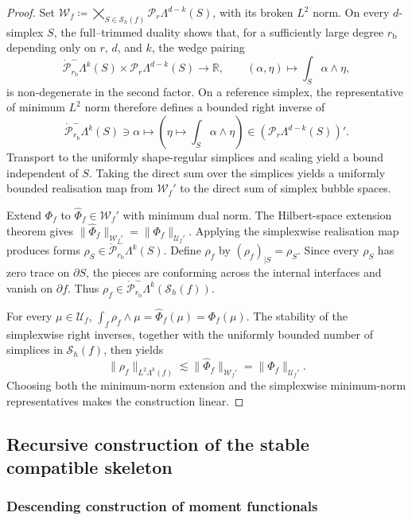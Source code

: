 \documentclass[a4paper,11pt]{article}
\theoremstyle{definition}
\newcommand{\Real}{\mathbb{R}}
\newcommand{\Sh}{\mathcal{S}_h}
\newcommand{\PL}[2]{\mathcal{P}_{#1}\Lambda^{#2}}
\newcommand{\PLtrimz}[2]{\mathring{\mathcal P}_{#1}^{-}\Lambda^{#2}}
\begin{document}
\begin{proof}
Set $\mathcal W_f \coloneqq \bigtimes_{S\in\Sh(f)} \PL{r}{d-k}(S)$, with its broken $L^2$ norm.
On every $d$-simplex $S$, the full--trimmed duality \cite[Corollaries~3.3--3.4]{Berchenko-Kogan:21} shows that, for a sufficiently large degree $r_{\mathrm b}$ depending only on $r$, $d$, and $k$, the wedge pairing
\[
\PLtrimz{r_{\mathrm b}}{k}(S)\times\PL{r}{d-k}(S)
\longrightarrow
\Real,
\qquad
(\alpha,\eta)
\mapsto
\int_S\alpha\wedge\eta,
\]
is non-degenerate in the second factor.
On a reference simplex, the representative of minimum $L^2$ norm therefore defines a bounded right inverse of
\[
\PLtrimz{r_{\mathrm b}}{k}(S)\ni\alpha
\mapsto
\left(
    \eta\mapsto\int_S\alpha\wedge\eta
\right)
\in
\left(\PL{r}{d-k}(S)\right)'.
\]
Transport to the uniformly shape-regular simplices and scaling yield a bound independent of $S$.
Taking the direct sum over the simplices yields a uniformly bounded realisation map from $\mathcal W_f'$ to the direct sum of simplex bubble spaces.

Extend $\Phi_f$ to $\widehat\Phi_f\in\mathcal W_f'$ with minimum dual norm.
The Hilbert-space extension theorem gives $\|\widehat\Phi_f\|_{\mathcal W_f'} = \|\Phi_f\|_{\mathcal U_f'}$.
Applying the simplexwise realisation map produces forms $\rho_S\in\PLtrimz{r_{\mathrm b}}{k}(S)$.
Define $\rho_f$ by $(\rho_f)_{|S}=\rho_S$.
Since every $\rho_S$ has zero trace on $\partial S$, the pieces are conforming across the internal interfaces and vanish on $\partial f$.
Thus $\rho_f\in\PLtrimz{r_{\mathrm b}}{k}(\Sh(f))$.

For every $\mu\in\mathcal U_f$, $\int_f\rho_f\wedge\mu = \widehat\Phi_f(\mu) = \Phi_f(\mu)$.
The stability of the simplexwise right inverses, together with the uniformly bounded number of simplices in $\Sh(f)$, then yields
\[
\|\rho_f\|_{L^2\Lambda^k(f)}
\lesssim
\|\widehat\Phi_f\|_{\mathcal W_f'}
=
\|\Phi_f\|_{\mathcal U_f'}.
\]
Choosing both the minimum-norm extension and the simplexwise minimum-norm representatives makes the construction linear.
\end{proof}

\subsection{Recursive construction of the stable compatible skeleton}
\label{subsec:recursive.skeleton}

\subsubsection{Descending construction of moment functionals}
\label{subsubsec:downward}
\end{document}
